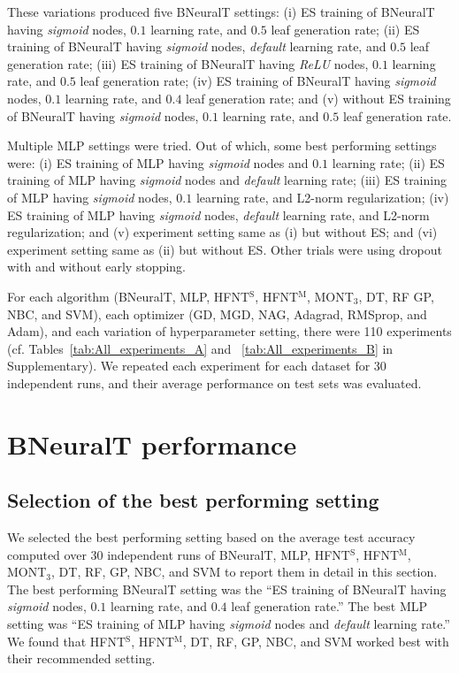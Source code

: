 \documentclass[11pt,a4paper]{article}
\begin{document}
    These variations produced five BNeuralT settings: (i) ES training of BNeuralT having \textit{sigmoid} nodes, $0.1$ learning rate, and $0.5$ leaf generation rate; (ii) ES training of BNeuralT having \textit{sigmoid} nodes, \textit{default} learning rate, and $0.5$ leaf generation rate; (iii) ES training of BNeuralT having \textit{ReLU} nodes, $0.1$ learning rate, and $0.5$ leaf generation rate; (iv) ES training of BNeuralT having \textit{sigmoid} nodes, $0.1$ learning rate, and $0.4$ leaf generation rate; and (v) without ES training of BNeuralT having \textit{sigmoid} nodes, $0.1$ learning rate, and $0.5$ leaf generation rate. 
    
    Multiple MLP settings were tried. Out of which, some best performing settings were: (i) ES training of MLP having \textit{sigmoid} nodes and $0.1$ learning rate; (ii) ES training of MLP having \textit{sigmoid} nodes and \textit{default} learning rate; (iii) ES training of MLP having \textit{sigmoid} nodes, $0.1$ learning rate, and L2-norm regularization; (iv) ES training of MLP having \textit{sigmoid} nodes, \textit{default} learning rate, and L2-norm regularization; and (v) experiment setting same as (i) but without ES; and (vi) experiment setting same as (ii) but without ES. Other trials were using dropout with and without early stopping. 
    
    For each algorithm (BNeuralT, MLP, HFNT$^{\text{S}}$, HFNT$^{\text{M}}$, MONT$_3$, DT, RF GP, NBC, and SVM), each optimizer (GD, MGD, NAG, Adagrad, RMSprop, and Adam), and each variation of hyperparameter setting, there were 110 experiments (cf. Tables~\ref{tab:All_experiments_A} and ~\ref{tab:All_experiments_B} in Supplementary). We repeated each experiment for each dataset for 30 independent runs, and their average performance on test sets was evaluated.
    
    \section{BNeuralT performance}
    \label{sec:res_dis}
\subsection{Selection of the best performing setting} 
We selected the best performing setting based on the average test accuracy computed over 30 independent runs of BNeuralT, MLP, HFNT$^{\text{S}}$, HFNT$^{\text{M}}$, MONT$_3$, DT, RF, GP, NBC, and SVM  to report them in detail in this section. The best performing BNeuralT setting was the ``ES training of BNeuralT having \textit{sigmoid} nodes, $0.1$ learning rate, and $0.4$ leaf generation rate.'' The best MLP setting was ``ES training of MLP having \textit{sigmoid} nodes and \textit{default} learning rate.'' We found that HFNT$^{\text{S}}$, HFNT$^{\text{M}}$, DT, RF, GP, NBC, and SVM worked best with their recommended setting.
    
\end{document}
